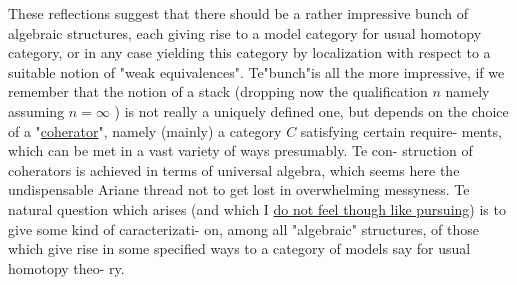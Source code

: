 
These reflections suggest that there should be a rather impressive
bunch of algebraic structures,  each giving rise to a model category
for  usual homotopy category,  or in any case yielding this category by
localization with respect to a suitable notion of "weak equivalences".
Te"bunch"is all the more impressive,  if we remember that the notion
of a stack  (dropping now the qualification $n$ namely assuming $n=\infty$ )  is
not really a uniquely defined one,  but depends on the choice of a
"\uline{coherator}",  namely (mainly) a category $C$ satisfying certain require-%
ments,  which can be met in a vast variety of ways\hand{,} presumably.  Te con-%
struction of coherators is achieved in terms of universal algebra,
which seems here the undispensable Ariane thread not to get lost in
overwhelming messyness.  Te natural question which arises  (and which I
\uline{do not feel though like pursuing})\hand{\unsure{//}} is to give  some kind of caracterizati-%
on,  among all "algebraic" structures,  of those which give rise in
some specified ways  to a category of models say for usual homotopy theo-%
ry.

